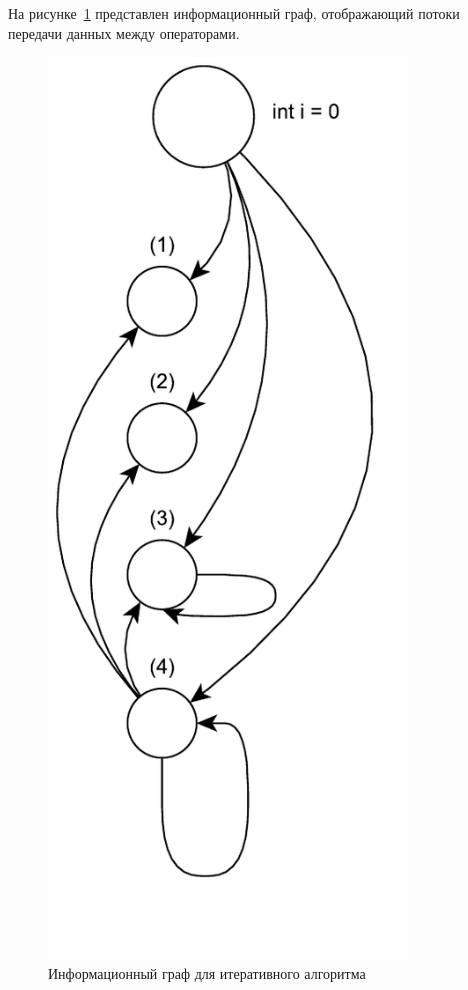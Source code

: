На рисунке~\ref{iterative_info_graph} представлен информационный граф, отображающий потоки передачи данных между операторами.

\begin{figure}[H]
	\centering
	\includegraphics[width=0.85\textwidth,height=0.5\textheight,keepaspectratio]{images/iterative_info_graph}
	\caption{Информационный граф для итеративного алгоритма}
	\label{iterative_info_graph}
\end{figure}

